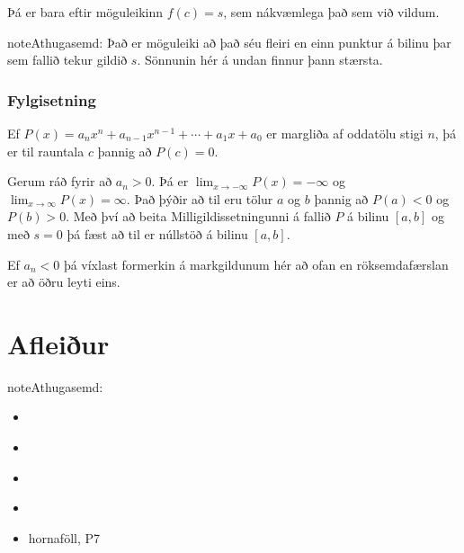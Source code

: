 \documentclass[b5paper,10pt,icelandic]{sphinxmanual}
\begin{document}
Þá er bara eftir möguleikinn \(f(c)=s\), sem nákvæmlega það sem við vildum.

\begin{sphinxadmonition}{note}{Athugasemd:}
Það er möguleiki að það séu fleiri en einn punktur á bilinu þar sem fallið tekur
gildið \(s\). Sönnunin hér á undan finnur þann stærsta.
\end{sphinxadmonition}


\subsection{Fylgisetning}
\label{\detokenize{kafli02:fylgisetning}}
Ef \(P(x)=a_nx^n+a_{n-1}x^{n-1}+\cdots+a_1x+a_0\) er margliða af
oddatölu stigi \(n\), þá er til rauntala \(c\) þannig að \(P(c)=0\).


Gerum ráð fyrir að \(a_n>0\). Þá er
\(\lim_{x\to -\infty} P(x) = -\infty\) og
\(\lim_{x\to \infty} P(x) = \infty\). Það þýðir að til eru tölur
\(a\) og \(b\) þannig að \(P(a)<0\) og \(P(b)>0\). Með
því að beita Milligildissetningunni á fallið \(P\) á bilinu
\([a,b]\) og með \(s=0\) þá fæst að til er núllstöð á bilinu
\([a,b]\).

Ef \(a_n < 0\) þá víxlast formerkin á markgildunum hér að ofan en röksemdafærslan er
að öðru leyti eins.


\chapter{Afleiður}
\label{\detokenize{kafli03:afleiur}}\label{\detokenize{kafli03::doc}}
\begin{sphinxadmonition}{note}{Athugasemd:}
\begin{itemize}
\item {} 
{\hyperref[\detokenize{kafli02:markgildi}]{}}

\item {} 
{\hyperref[\detokenize{kafli02:samfelldni}]{}}

\item {} 
{\hyperref[\detokenize{kafli01:samskeyting}]{}}

\item {} 
{\hyperref[\detokenize{kafli01:andhverfa}]{}}

\item {} 
hornaföll, P7

\end{itemize}
\end{sphinxadmonition}
\end{document}

